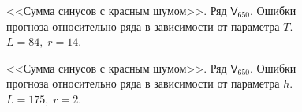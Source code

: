 \documentclass[specialist,
               substylefile = spbu.rtx,
               subf,href,colorlinks=true, 12p]{disser}
\begin{document}
\begin{figure}[H]
	\captionsetup{justification=centering}
	\caption{<<Сумма синусов с красным шумом>>. Ряд $\mathsf{V}_{650}$. Ошибки прогноза относительно ряда в зависимости от параметра $T$. $L = 84, \; r = 14$.}
\end{figure}


\begin{figure}[H]
	\captionsetup{justification=centering}
	\caption{<<Сумма синусов с красным шумом>>. Ряд $\mathsf{V}_{650}$. Ошибки прогноза относительно ряда в зависимости от параметра $h$. $L = 175, \; r = 2$.}
	\label{serr_r2.h}
\end{figure}
\end{document}
